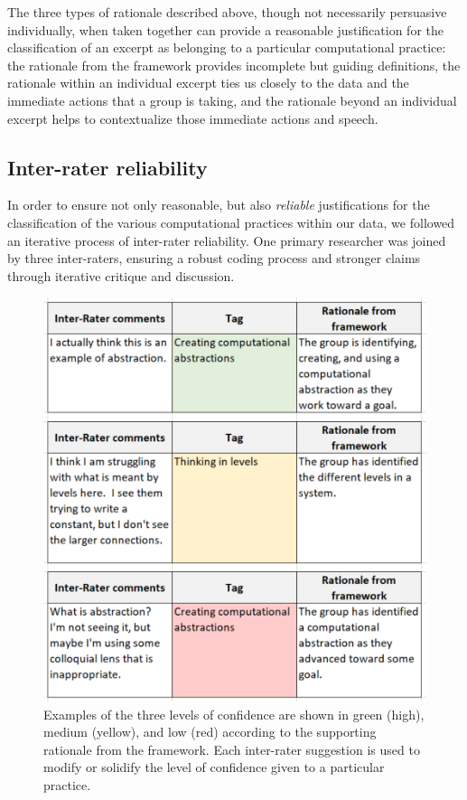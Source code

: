\documentclass{msuphddissertation}
\begin{document}
\begin{doublespace}
The three types of rationale described above, though not necessarily persuasive individually, when taken together can provide a reasonable justification for the classification of an excerpt as belonging to a particular computational practice: the rationale from the framework provides incomplete but guiding definitions, the rationale within an individual excerpt ties us closely to the data and the immediate actions that a group is taking, and the rationale beyond an individual excerpt helps to contextualize those immediate actions and speech.

\subsection{Inter-rater reliability}

In order to ensure not only reasonable, but also \textit{reliable} justifications for the classification of the various computational practices within our data, we followed an iterative process of inter-rater reliability.  One primary researcher was joined by three inter-raters, ensuring a robust coding process and stronger claims through iterative critique and discussion.

\begin{figure}\centering
\includegraphics[scale=0.5]{./images/CH5LevelsofConfidence.pdf}
\caption{Examples of the three levels of confidence are shown in green (high), medium (yellow), and low (red) according to the supporting rationale from the framework.  Each inter-rater suggestion is used to modify or solidify the level of confidence given to a particular practice.}\label{CH5:LevelsofConfidence}
\end{figure}


\end{doublespace}
\end{document}

